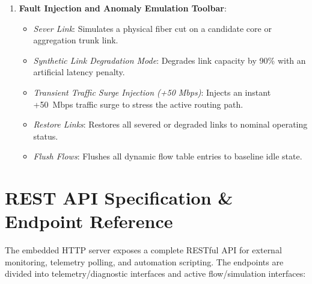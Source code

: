 \documentclass[12pt,a4paper,oneside]{report}
\begin{document}
\begin{enumerate}
    \item \textbf{Fault Injection and Anomaly Emulation Toolbar}:
    \begin{itemize}
        \item \textit{Sever Link}: Simulates a physical fiber cut on a candidate core or aggregation trunk link.
        \item \textit{Synthetic Link Degradation Mode}: Degrades link capacity by 90\% with an artificial latency penalty.
        \item \textit{Transient Traffic Surge Injection (+50 Mbps)}: Injects an instant +50~Mbps traffic surge to stress the active routing path.
        \item \textit{Restore Links}: Restores all severed or degraded links to nominal operating status.
        \item \textit{Flush Flows}: Flushes all dynamic flow table entries to baseline idle state.
    \end{itemize}
\end{enumerate}

\section{REST API Specification \& Endpoint Reference}
The embedded HTTP server exposes a complete RESTful API for external monitoring, telemetry polling, and automation scripting. The endpoints are divided into telemetry/diagnostic interfaces and active flow/simulation interfaces:
\end{document}
